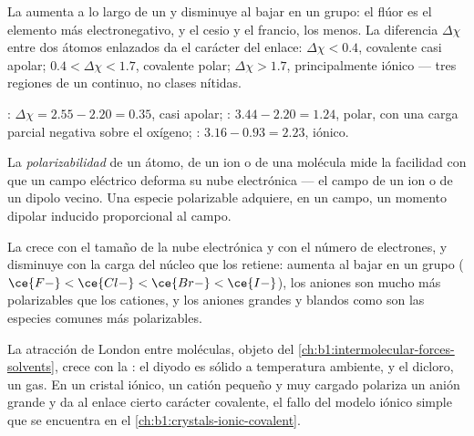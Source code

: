 \begin{proposition}\label{prop:b1:periodicity:en-trend}
La  aumenta a lo largo de un  y disminuye al
bajar en un grupo: el flúor es el elemento más electronegativo, y el
cesio y el francio, los menos. La diferencia $\Delta\chi$ entre dos
átomos enlazados da el carácter del enlace: $\Delta\chi < 0.4$, covalente
casi apolar; $0.4 < \Delta\chi < 1.7$, covalente polar;
$\Delta\chi > 1.7$, principalmente iónico --- tres regiones de un continuo, no clases
nítidas.
\end{proposition}

\begin{example}\label{ex:b1:periodicity:bonds}
: $\Delta\chi = 2.55 - 2.20 = 0.35$, casi apolar;
: $3.44 - 2.20 = 1.24$, polar, con una carga parcial negativa
sobre el oxígeno; : $3.16 - 0.93 = 2.23$, iónico.
\end{example}

\begin{definition}[Polarizabilidad]\label{def:b1:periodicity:polarisability}
La \emph{polarizabilidad} de un átomo, de un ion o
de una molécula mide la facilidad con que un campo eléctrico deforma su
nube electrónica --- el campo de un ion o de un dipolo vecino. Una
especie polarizable adquiere, en un campo, un momento dipolar inducido
proporcional al campo.
\end{definition}

\begin{proposition}\label{prop:b1:periodicity:polarisability-trend}
La  crece con el tamaño de la nube electrónica y con el
número de electrones, y disminuye con la carga del núcleo que los
retiene: aumenta al bajar en un grupo ($\ce{F-} < \ce{Cl-} < \ce{Br-} <
\ce{I-}$), los aniones son mucho más polarizables que los cationes, y los
aniones grandes y blandos como  son las especies comunes más
polarizables.
\end{proposition}

\begin{example}\label{ex:b1:periodicity:pol}
La atracción de London entre moléculas, objeto del
\cref{ch:b1:intermolecular-forces-solvents}, crece con la
: el diyodo es sólido a temperatura ambiente, y el
dicloro, un gas. En un cristal iónico, un catión pequeño y muy cargado
polariza un anión grande y da al enlace cierto carácter covalente, el
fallo del modelo iónico simple que se encuentra en el
\cref{ch:b1:crystals-ionic-covalent}.
\end{example}

